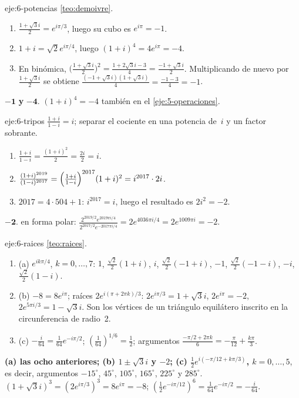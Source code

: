 \begin{solucion}{eje:6-potencias}
\planteamiento \cref{teo:demoivre}.
\pasos
\begin{enumerate}[label=\arabic*.]
  \item $\frac{1+\sqrt3i}{2}=e^{i\pi/3}$, luego su cubo es $e^{i\pi}=-1$.
  \item $1+i=\sqrt2e^{i\pi/4}$, luego $(1+i)^{4}=4e^{i\pi}=-4$.
  \item En binómica, $\bigl(\frac{1+\sqrt3i}{2}\bigr)^{2}=\frac{1+2\sqrt3i-3}{4}=\frac{-1+\sqrt3i}{2}$. Multiplicando de nuevo por $\frac{1+\sqrt3i}{2}$ se obtiene $\frac{(-1+\sqrt3i)(1+\sqrt3i)}{4}=\frac{-1-3}{4}=-1$.
\end{enumerate}
\resultado $\mathbf{-1}$ \textbf{y} $\mathbf{-4}$.
\comprobacion $(1+i)^{4}=-4$ también en el \cref{eje:5-operaciones}.
\end{solucion}

\begin{solucion}{eje:6-tripos}
\planteamiento $\frac{1+i}{1-i}=i$; separar el cociente en una potencia de~$i$ y un factor sobrante.
\pasos
\begin{enumerate}[label=\arabic*.]
  \item $\frac{1+i}{1-i}=\frac{(1+i)^{2}}{2}=\frac{2i}{2}=i$.
  \item $\frac{(1+i)^{2019}}{(1-i)^{2017}}=\Bigl(\frac{1+i}{1-i}\Bigr)^{2017}(1+i)^{2}=i^{2017}\cdot2i$.
  \item $2017=4\cdot504+1$: $i^{2017}=i$, luego el resultado es $2i^{2}=-2$.
\end{enumerate}
\resultado $\mathbf{-2}$.
\comprobacion en forma polar: $\frac{2^{2019/2}e^{2019\pi i/4}}{2^{2017/2}e^{-2017\pi i/4}}=2e^{4036\pi i/4}=2e^{1009\pi i}=-2$.
\end{solucion}

\begin{solucion}{eje:6-raices}
\planteamiento \cref{teo:raices}.
\pasos
\begin{enumerate}[label=\arabic*.]
  \item (a) $e^{ik\pi/4}$, $k=0,\dots,7$: $1$, $\frac{\sqrt2}{2}(1+i)$, $i$, $\frac{\sqrt2}{2}(-1+i)$, $-1$, $\frac{\sqrt2}{2}(-1-i)$, $-i$, $\frac{\sqrt2}{2}(1-i)$.
  \item (b) $-8=8e^{i\pi}$; raíces $2e^{i(\pi+2\pi k)/3}$: $2e^{i\pi/3}=1+\sqrt3i$, $2e^{i\pi}=-2$, $2e^{5\pi i/3}=1-\sqrt3i$. Son los vértices de un triángulo equilátero inscrito en la circunferencia de radio~2.
  \item (c) $-\frac{i}{64}=\frac1{64}e^{-i\pi/2}$; $(\frac1{64})^{1/6}=\frac12$; argumentos $\frac{-\pi/2+2\pi k}{6}=-\frac{\pi}{12}+\frac{k\pi}{3}$.
\end{enumerate}
\resultado \textbf{(a) las ocho anteriores; (b) $1\pm\sqrt3i$ y $-2$; (c) $\frac12e^{i(-\pi/12+k\pi/3)}$, $k=0,\dots,5$}, es decir, argumentos $-15^{\circ}$, $45^{\circ}$, $105^{\circ}$, $165^{\circ}$, $225^{\circ}$ y $285^{\circ}$.
\comprobacion $(1+\sqrt3i)^{3}=(2e^{i\pi/3})^{3}=8e^{i\pi}=-8$; $(\frac12e^{-i\pi/12})^{6}=\frac1{64}e^{-i\pi/2}=-\frac{i}{64}$.
\end{solucion}

